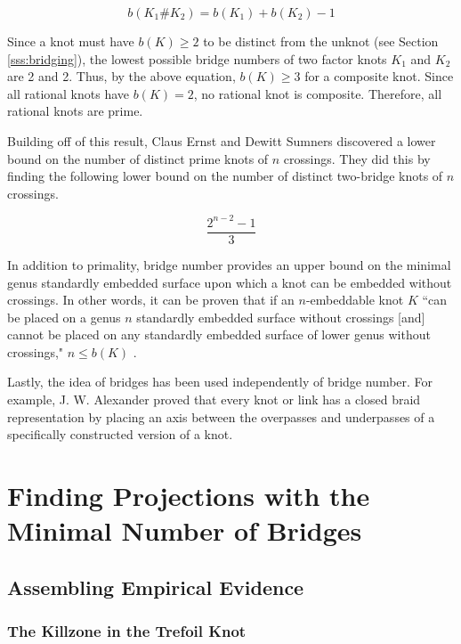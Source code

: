 \documentclass[titlepage]{article}
\newcommand{\dq}[4][]{``#2"#1 \cite[#4]{#3}.}
\begin{document}
\begin{equation*}
    b(K_1\#K_2) = b(K_1)+b(K_2)-1
\end{equation*}

Since a knot must have $b(K)\geq 2$ to be distinct from the unknot (see Section \ref{sss:bridging}), the lowest possible bridge numbers of two factor knots $K_1$ and $K_2$ are 2 and 2. Thus, by the above equation, $b(K)\geq 3$ for a composite knot. Since all rational knots have $b(K)=2$, no rational knot is composite. Therefore, all rational knots are prime.\par
Building off of this result, Claus Ernst and Dewitt Sumners discovered a lower bound on the number of distinct prime knots of $n$ crossings. They did this by finding the following lower bound on the number of distinct two-bridge knots of $n$ crossings.

\begin{equation*}
    \frac{2^{n-2}-1}{3}
\end{equation*}

In addition to primality, bridge number provides an upper bound on the minimal genus standardly embedded surface upon which a knot can be embedded without crossings. In other words, it can be proven that if an $n$-embeddable knot $K$ \dq[ $n\leq b(K)$]{can be placed on a genus $n$ standardly embedded surface without crossings [and] cannot be placed on any standardly embedded surface of lower genus without crossings,}{bib:knotbook}{114}\par
Lastly, the idea of bridges has been used independently of bridge number. For example, J. W. Alexander proved that every knot or link has a closed braid representation by placing an axis between the overpasses and underpasses of a specifically constructed version of a knot.
\newpage



\section{Finding Projections with the Minimal Number of Bridges}
\subsection{Assembling Empirical Evidence}\label{sss:evidence}
\subsubsection{The Killzone in the Trefoil Knot}
\end{document}
